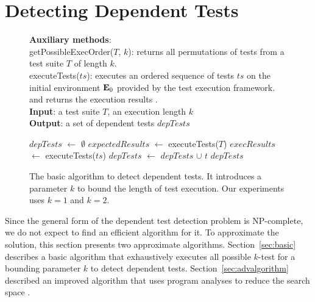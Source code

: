 \section{Detecting Dependent Tests}
\label{sec:detecting}

\newcommand{\testlist}[0]{\ensuremath{T^k_i}}
\newcommand{\executeTestsInOrder}[1]{\result{#1}{\env_0}}

\begin{figure}[t]
\textbf{Auxiliary methods}:\\
getPossibleExecOrder($T$, $k$): returns all permutations of tests from a test suite $T$ of length $k$.\\
executeTests($ts$): executes an ordered sequence of tests $ts$ 
on the initial environment $\mathbf{E}_0$ provided by the test execution framework.
and returns the execution results .\\
\textbf{Input}: a test suite $\mathit{T}$, an execution length $\mathit{k}$\\
\textbf{Output}: a set of dependent tests $\mathit{depTests}$\\
\vspace{-5mm}
\begin{algorithmic}[1]
\STATE $\mathit{depTests}$ $\leftarrow$ $\emptyset$
\STATE $\mathit{expectedResults}$ $\leftarrow$ executeTests($T$)
\STATE $\mathit{execResults}$ $\leftarrow$ executeTests($ts$)
\STATE $\mathit{depTests}$ $\leftarrow$ $\mathit{depTests}$ $\cup$ $\mathit{t}$
\ENDIF
\ENDFOR
\ENDFOR
\RETURN $\mathit{depTests}$
\end{algorithmic}
\vspace{-3mm}
\caption {The basic algorithm to detect dependent tests.
It introduces a parameter $k$ to bound the length of
test execution. Our experiments uses $k=1$ and $k=2$. } 
\label{fig:dtalgorithm}
\end{figure}

Since the general form of the dependent test detection problem is
NP-complete, we do not expect to find an efficient algorithm for it.
To approximate the solution, this section
presents two approximate algorithms.
Section~\ref{sec:basic} describes a basic algorithm that
exhaustively executes all possible $k$-test for a bounding parameter $k$
to detect dependent tests.
Section~\ref{sec:advalgorithm} described an improved algorithm
that uses program analyses to reduce the search space
.


